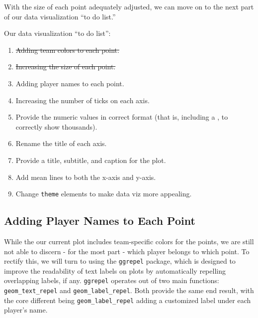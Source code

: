 \documentclass[
  letterpaper,
]{krantz}
\begin{document}
With the size of each point adequately adjusted, we can move on to the
next part of our data visualization ``to do list.''

\begin{tcolorbox}[enhanced jigsaw, left=2mm, toprule=.15mm, opacitybacktitle=0.6, leftrule=.75mm, bottomrule=.15mm, colbacktitle=quarto-callout-note-color!10!white, breakable, colback=white, bottomtitle=1mm, toptitle=1mm, title=\textcolor{quarto-callout-note-color}{\faInfo}\hspace{0.5em}{Note}, coltitle=black, titlerule=0mm, arc=.35mm, opacityback=0, colframe=quarto-callout-note-color-frame, rightrule=.15mm]

Our data visualization ``to do list'':

\begin{enumerate}
\def\labelenumi{\arabic{enumi}.}
\item
  \st{Adding team colors to each point.}
\item
  \st{Increasing the size of each point.}
\item
  Adding player names to each point.
\item
  Increasing the number of ticks on each axis.
\item
  Provide the numeric values in correct format (that is, including a ,
  to correctly show thousands).
\item
  Rename the title of each axis.
\item
  Provide a title, subtitle, and caption for the plot.
\item
  Add mean lines to both the x-axis and y-axis.
\item
  Change \texttt{theme} elements to make data viz more appealing.
\end{enumerate}

\end{tcolorbox}

\hypertarget{adding-player-names-to-each-point}{%
\subsection{Adding Player Names to Each
Point}\label{adding-player-names-to-each-point}}

While the our current plot includes team-specific colors for the points,
we are still not able to discern - for the most part - which player
belongs to which point. To rectify this, we will turn to using the
\texttt{ggrepel} package, which is designed to improve the readability
of text labels on plots by automatically repelling overlapping labels,
if any. \texttt{ggrepel} operates out of two main functions:
\texttt{geom\_text\_repel} and \texttt{geom\_label\_repel}. Both provide
the same end result, with the core different being
\texttt{geom\_label\_repel} adding a customized label under each
player's name.
\end{document}
